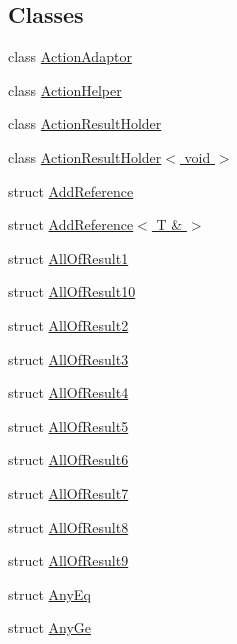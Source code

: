 \subsection*{Classes}
\begin{DoxyCompactItemize}
\item 
class \hyperlink{classtesting_1_1internal_1_1_action_adaptor}{Action\+Adaptor}
\item 
class \hyperlink{classtesting_1_1internal_1_1_action_helper}{Action\+Helper}
\item 
class \hyperlink{classtesting_1_1internal_1_1_action_result_holder}{Action\+Result\+Holder}
\item 
class \hyperlink{classtesting_1_1internal_1_1_action_result_holder_3_01void_01_4}{Action\+Result\+Holder$<$ void $>$}
\item 
struct \hyperlink{structtesting_1_1internal_1_1_add_reference}{Add\+Reference}
\item 
struct \hyperlink{structtesting_1_1internal_1_1_add_reference_3_01_t_01_6_01_4}{Add\+Reference$<$ T \& $>$}
\item 
struct \hyperlink{structtesting_1_1internal_1_1_all_of_result1}{All\+Of\+Result1}
\item 
struct \hyperlink{structtesting_1_1internal_1_1_all_of_result10}{All\+Of\+Result10}
\item 
struct \hyperlink{structtesting_1_1internal_1_1_all_of_result2}{All\+Of\+Result2}
\item 
struct \hyperlink{structtesting_1_1internal_1_1_all_of_result3}{All\+Of\+Result3}
\item 
struct \hyperlink{structtesting_1_1internal_1_1_all_of_result4}{All\+Of\+Result4}
\item 
struct \hyperlink{structtesting_1_1internal_1_1_all_of_result5}{All\+Of\+Result5}
\item 
struct \hyperlink{structtesting_1_1internal_1_1_all_of_result6}{All\+Of\+Result6}
\item 
struct \hyperlink{structtesting_1_1internal_1_1_all_of_result7}{All\+Of\+Result7}
\item 
struct \hyperlink{structtesting_1_1internal_1_1_all_of_result8}{All\+Of\+Result8}
\item 
struct \hyperlink{structtesting_1_1internal_1_1_all_of_result9}{All\+Of\+Result9}
\item 
struct \hyperlink{structtesting_1_1internal_1_1_any_eq}{Any\+Eq}
\item 
struct \hyperlink{structtesting_1_1internal_1_1_any_ge}{Any\+Ge}

\end{DoxyCompactItemize}

